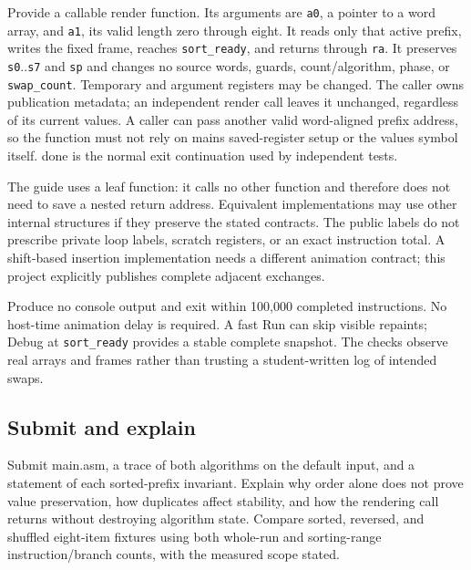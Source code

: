 Provide a callable render function. Its arguments are \texttt{a0}, a
pointer to a word array, and \texttt{a1}, its valid length zero through
eight. It reads only that active prefix, writes the fixed frame, reaches
\texttt{sort\_ready}, and returns through \texttt{ra}. It preserves
\texttt{s0}..\texttt{s7} and \texttt{sp} and changes no source words,
guards, count/algorithm, phase, or \texttt{swap\_count}. Temporary and
argument registers may be changed. The caller owns publication metadata;
an independent render call leaves it unchanged, regardless of its
current values. A caller can pass another valid word-aligned prefix
address, so the function must not rely on main\textquotesingle s
saved-register setup or the values symbol itself. done is the normal
exit continuation used by independent tests.

The guide uses a leaf function: it calls no other function and therefore
does not need to save a nested return address. Equivalent
implementations may use other internal structures if they preserve the
stated contracts. The public labels do not prescribe private loop
labels, scratch registers, or an exact instruction total. A shift-based
insertion implementation needs a different animation contract; this
project explicitly publishes complete adjacent exchanges.

Produce no console output and exit within 100,000 completed
instructions. No host-time animation delay is required. A fast Run can
skip visible repaints; Debug at \texttt{sort\_ready} provides a stable
complete snapshot. The checks observe real arrays and frames rather than
trusting a student-written log of intended swaps.

\subsection{Submit and
  explain}\label{009-sorting-visualizer-assignment-submit-and-explain}

Submit main.asm, a trace of both algorithms on the default input, and a
statement of each sorted-prefix invariant. Explain why order alone does
not prove value preservation, how duplicates affect stability, and how
the rendering call returns without destroying algorithm state. Compare
sorted, reversed, and shuffled eight-item fixtures using both whole-run
and sorting-range instruction/branch counts, with the measured scope
stated.
